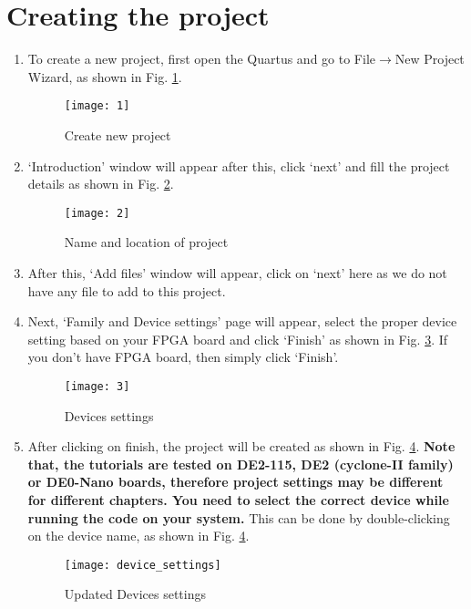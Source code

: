 \section{Creating the project} \label{sec:new_project}
\begin{enumerate}
	\item To create a new project, first open the Quartus and go to File$\rightarrow$New Project Wizard, as shown in Fig. \ref{fig:createNewProject}. 

\begin{figure}[!h]
	\centering
	\texttt{[image: 1]}
	\caption{Create new project}
	\label{fig:createNewProject}
\end{figure}

\item `Introduction' window will appear after this, click `next' and fill the project details as shown in Fig. \ref{fig:nameProject}. 

\begin{figure}[!h]
	\centering
	\texttt{[image: 2]}
	\caption{Name and location of project}
	\label{fig:nameProject}
\end{figure}

\item After this, `Add files' window will appear, click on `next' here as we do not have any file to add to this project. 

\item Next, `Family and Device settings' page will appear, select the proper device setting based on your FPGA board and click `Finish' as shown in Fig. \ref{fig:deviceSettings}. If you don't have FPGA board, then simply click `Finish'. 
\begin{figure}[h]
	\centering
	\texttt{[image: 3]}
	\caption{Devices settings}
	\label{fig:deviceSettings}
\end{figure}


\item After clicking on finish, the project will be created as shown in Fig. \ref{fig:device_settings}. \textbf{Note that, the tutorials are tested on DE2-115, DE2 (cyclone-II family) or DE0-Nano boards, therefore project settings may be different for different chapters. You need to select the correct device while running the code on your system.} This can be done by double-clicking on the device name, as shown in Fig. \ref{fig:device_settings}.

\begin{figure}[h]
	\centering
	\texttt{[image: device\_settings]}
	\caption{Updated Devices settings}
	\label{fig:device_settings}
\end{figure}
\end{enumerate}

